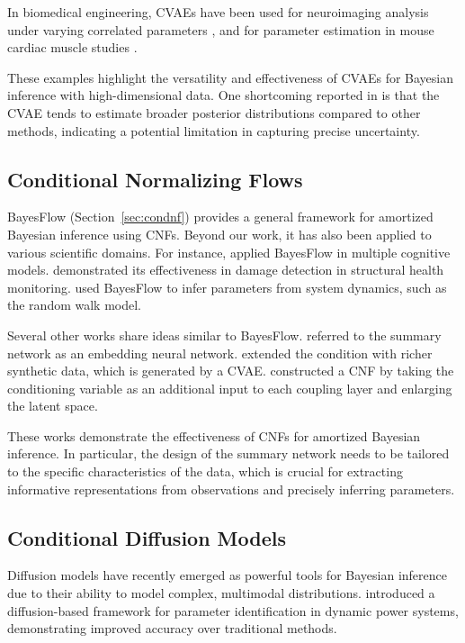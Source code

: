 In biomedical engineering, \acp{CVAE} have been used for neuroimaging analysis under varying correlated parameters \citeyearpar{cvae2025}, and for parameter estimation in mouse cardiac muscle studies \citeyearpar{TUNE2025179}. 

These examples highlight the versatility and effectiveness of \acp{CVAE} for Bayesian inference with high-dimensional data. One shortcoming reported in \citep{Sun_2025} is that the \ac{CVAE} tends to estimate broader posterior distributions compared to other methods, indicating a potential limitation in capturing precise uncertainty.

\subsection{Conditional Normalizing Flows}
BayesFlow (Section~\ref{sec:condnf}) \citep{radev2020bayesflow} provides a general framework for amortized Bayesian inference using \acp{CNF}. Beyond our work, it has also been applied to various scientific domains. For instance, \citeauthor{Kucharsk2025} \citeyearpar{Kucharsk2025} applied BayesFlow in multiple cognitive models. \citeauthor{Zeng2023} \citeyearpar{Zeng2023} demonstrated its effectiveness in damage detection in structural health monitoring. \citeauthor{Rahmandad2025_uh} \citeyearpar{Rahmandad2025_uh} used BayesFlow to infer parameters from system dynamics, such as the random walk model. 

Several other works share ideas similar to BayesFlow. \citeauthor{De_Santi_2024} \citeyearpar{De_Santi_2024} referred to the summary network as an embedding neural network. \citeauthor{zhdanov2022gisaxs} \citeyearpar{zhdanov2022gisaxs} extended the condition with richer synthetic data, which is generated by a \ac{CVAE}. \citeauthor{DONG2025117457} \citeyearpar{DONG2025117457} constructed a \ac{CNF} by taking the conditioning variable as an additional input to each coupling layer and enlarging the latent space. 

These works demonstrate the effectiveness of \acp{CNF} for amortized Bayesian inference. In particular, the design of the summary network needs to be tailored to the specific characteristics of the data, which is crucial for extracting informative representations from observations and precisely inferring parameters.

\subsection{Conditional Diffusion Models}
Diffusion models have recently emerged as powerful tools for Bayesian inference due to their ability to model complex, multimodal distributions. \citeauthor{zhu2025diffusion} \citeyearpar{zhu2025diffusion} introduced a diffusion-based framework for parameter identification in dynamic power systems, demonstrating improved accuracy over traditional methods. 

